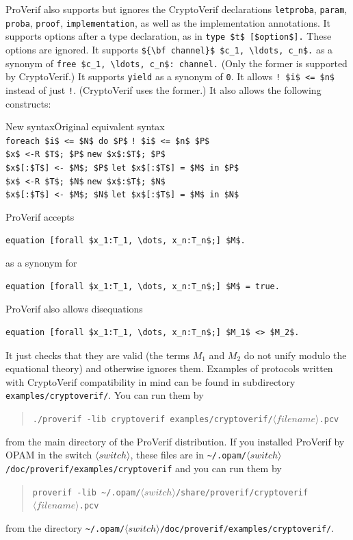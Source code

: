 \documentclass{book}
\newcommand{\nonterm}[1]{\langle\mathit{#1}\rangle}
\newcommand{\filenamevar}{\nonterm{filename}}
\newcommand{\switchdir}{\nonterm{switch}}
\newcommand{\opamsubdir}[1]{\nolinkurl{~/.opam/}$\switchdir$\nolinkurl{/#1}}
\begin{document}
ProVerif also supports but ignores the CryptoVerif declarations
\lstinline!letproba!, \lstinline!param!, \lstinline!proba!, \lstinline!proof!,
\lstinline!implementation!, as well as the implementation annotations.
It supports options after a type declaration, as in
\lstinline!type $t$ [$option$].! These options are ignored.
It supports \lstinline!${\bf channel}$ $c_1, \ldots, c_n$.!
as a synonym of \lstinline!free $c_1, \ldots, c_n$: channel.!
(Only the former is supported by CryptoVerif.)
It supports \lstinline!yield! as a synonym of \lstinline!0!.
It allows \lstinline{! $i$ <= $n$} instead of just \lstinline{!}.
(CryptoVerif uses the former.)
It also allows the following constructs:
\begin{tabbing}
New syntax\qquad\qquad\qquad\=Original equivalent syntax\\[1mm]
\lstinline{foreach $i$ <= $N$ do $P$} \> {\lstinline{! $i$ <= $n$ $P$}}\\
\lstinline{$x$ <-R $T$; $P$} \> \lstinline{new $x$:$T$; $P$}\\
\lstinline!$x$[:$T$] <- $M$; $P$! \> \lstinline!let $x$[:$T$] = $M$ in $P$!\\
\lstinline!$x$ <-R $T$; $N$! \> \lstinline!new $x$:$T$; $N$! \\
\lstinline!$x$[:$T$] <- $M$; $N$! \> \lstinline!let $x$[:$T$] = $M$ in $N$!
\end{tabbing}
ProVerif accepts
\begin{lstlisting}[numbers=none]
equation [forall $x_1:T_1, \dots, x_n:T_n$;] $M$.
\end{lstlisting}
as a synonym for
\begin{lstlisting}[numbers=none]
equation [forall $x_1:T_1, \dots, x_n:T_n$;] $M$ = true.
\end{lstlisting}
ProVerif also allows disequations
\begin{lstlisting}[numbers=none]
equation [forall $x_1:T_1, \dots, x_n:T_n$;] $M_1$ <> $M_2$.
\end{lstlisting}
It just checks that they are valid (the terms $M_1$ and $M_2$
do not unify modulo the equational theory) and otherwise ignores them.
Examples of protocols written with CryptoVerif compatibility
in mind can be found in subdirectory {\tt examples/cryptoverif/}.
You can run them by
\begin{quote}
\texttt{./proverif -lib cryptoverif examples/cryptoverif/$\filenamevar$.pcv}
\end{quote}
from the main directory of the ProVerif distribution.
If you installed ProVerif by OPAM in the switch $\switchdir$, these files are
in \opamsubdir{doc/proverif/examples/cryptoverif}
and you can run them by
\begin{quote}
\texttt{proverif -lib \opamsubdir{share/proverif/cryptoverif} $\filenamevar$.pcv}
\end{quote}
from the directory \opamsubdir{doc/proverif/examples/cryptoverif/}.
\end{document}
